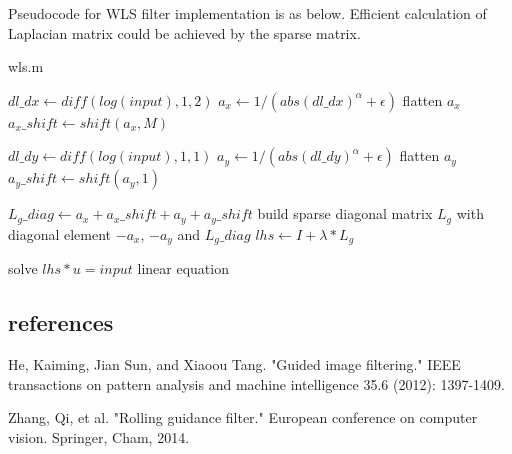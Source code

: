 \documentclass[extendedabs]{bmvc2k}
\begin{document}
Pseudocode for WLS filter implementation is as below. Efficient calculation of 
Laplacian matrix could be achieved by the sparse matrix.

\begin{algorithm}
    \caption{wls.m}
    $dl\_dx \gets diff(log(input), 1, 2)$\;
    $a_x \gets 1 / (abs(dl\_dx)^\alpha + \epsilon)$\;
    flatten $a_x$\;
    $a_x\_shift \gets shift(a_x, M)$\;

    $dl\_dy \gets diff(log(input), 1, 1)$\;
    $a_y \gets 1 / (abs(dl\_dy)^\alpha + \epsilon)$\;
    flatten $a_y$\;
    $a_y\_shift \gets shift(a_y, 1)$\;

    $L_g\_diag \gets a_x + a_x\_shift + a_y + a_y\_shift$\;
    build sparse diagonal matrix $L_g$ with diagonal element $-a_x$, $-a_y$ and $L_g\_diag$\;
    $lhs \gets I + \lambda * L_g$\;

    solve $lhs * u = input$ linear equation\;
\end{algorithm}

\subsection*{references}

\begin{thebibliography}{9}
    He, Kaiming, Jian Sun, and Xiaoou Tang. "Guided image filtering." 
    IEEE transactions on pattern analysis and machine intelligence 35.6 (2012): 1397-1409.
    
    Zhang, Qi, et al. "Rolling guidance filter." European conference on computer vision. Springer, Cham, 2014.
\end{thebibliography}
\end{document}
